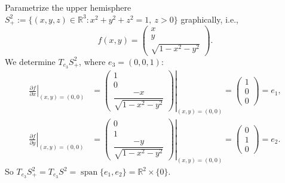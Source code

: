 \begin{example}
Parametrize the upper hemisphere $S^2_+ := \{(x,y,z)\in\mathbb{R}^3 : x^2+y^2+z^2=1,\ z>0\}$
graphically, i.e.,
\[f(x,y) = \begin{pmatrix} x \\ y \\ \sqrt{1-x^2-y^2} \end{pmatrix}.\]
We determine $T_{e_3}S^2_+$, where $e_3 = (0,0,1)$:
\begin{align*}
\left.\frac{\partial f}{\partial x}\right|_{(x,y)=(0,0)}
  &= \left.\begin{pmatrix} 1 \\ 0 \\ \dfrac{-x}{\sqrt{1-x^2-y^2}}\end{pmatrix}\right|_{(x,y)=(0,0)}
   = \begin{pmatrix}1\\0\\0\end{pmatrix} = e_1, \\[1ex]
\left.\frac{\partial f}{\partial y}\right|_{(x,y)=(0,0)}
  &= \left.\begin{pmatrix} 0 \\ 1 \\ \dfrac{-y}{\sqrt{1-x^2-y^2}}\end{pmatrix}\right|_{(x,y)=(0,0)}
   = \begin{pmatrix}0\\1\\0\end{pmatrix} = e_2.
\end{align*}
So $T_{e_3}S^2_+ = T_{e_3}S^2 = \operatorname{span}\{e_1,e_2\} = \mathbb{R}^2\times\{0\}$.
\end{example}

